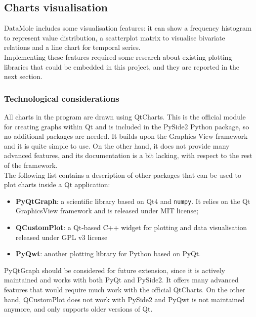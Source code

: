 \subsection{Charts visualisation}
DataMole includes some visualisation features: it can show a frequency histogram to represent value distribution, a scatterplot matrix to visualise bivariate relations and a line chart for temporal series. \\
Implementing these features required some research about existing plotting libraries that could be embedded in this project, and they are reported in the next section.

\subsubsection{Technological considerations}
All charts in the program are drawn using QtCharts. This is the official module for creating graphs within Qt and is included in the PySide2 Python package, so no additional packages are needed. It builds upon the Graphics View framework and it is quite simple to use. On the other hand, it does not provide many advanced features, and its documentation is a bit lacking, with respect to the rest of the framework.\\
The following list contains a description of other packages that can be used to plot charts inside a Qt application:
\begin{itemize}
	\item \textbf{PyQtGraph}: a scientific library based on Qt4 and \texttt{numpy}. It relies on the Qt GraphicsView framework and is released under MIT license;
	\item \textbf{QCustomPlot}: a Qt-based C++ widget for plotting and data visualisation released under GPL v3 license
	\item \textbf{PyQwt}: another plotting library for Python based on PyQt.
\end{itemize}
PyQtGraph should be considered for future extension, since it is actively maintained and works with both PyQt and PySide2. It offers many advanced features that would require much work with the official QtCharts. On the other hand, QCustomPlot does not work with PySide2 and PyQwt is not maintained anymore, and only supports older versions of Qt.

